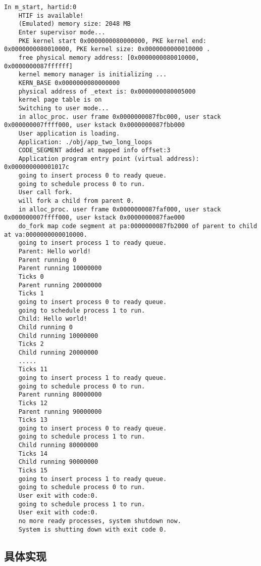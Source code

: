 \begin{lstlisting}[caption={lab9实验结果（移植K210前）}]
    In m_start, hartid:0
    HTIF is available!
    (Emulated) memory size: 2048 MB
    Enter supervisor mode...
    PKE kernel start 0x0000000080000000, PKE kernel end: 0x0000000080010000, PKE kernel size: 0x0000000000010000 .
    free physical memory address: [0x0000000080010000, 0x0000000087ffffff]
    kernel memory manager is initializing ...
    KERN_BASE 0x0000000080000000
    physical address of _etext is: 0x0000000080005000
    kernel page table is on
    Switching to user mode...
    in alloc_proc. user frame 0x0000000087fbc000, user stack 0x000000007ffff000, user kstack 0x0000000087fbb000
    User application is loading.
    Application: ./obj/app_two_long_loops
    CODE_SEGMENT added at mapped info offset:3
    Application program entry point (virtual address): 0x000000000001017c
    going to insert process 0 to ready queue.
    going to schedule process 0 to run.
    User call fork.
    will fork a child from parent 0.
    in alloc_proc. user frame 0x0000000087faf000, user stack 0x000000007ffff000, user kstack 0x0000000087fae000
    do_fork map code segment at pa:0000000087fb2000 of parent to child at va:0000000000010000.
    going to insert process 1 to ready queue.
    Parent: Hello world!
    Parent running 0
    Parent running 10000000
    Ticks 0
    Parent running 20000000
    Ticks 1
    going to insert process 0 to ready queue.
    going to schedule process 1 to run.
    Child: Hello world!
    Child running 0
    Child running 10000000
    Ticks 2
    Child running 20000000
    .....
    Ticks 11
    going to insert process 1 to ready queue.
    going to schedule process 0 to run.
    Parent running 80000000
    Ticks 12
    Parent running 90000000
    Ticks 13
    going to insert process 0 to ready queue.
    going to schedule process 1 to run.
    Child running 80000000
    Ticks 14
    Child running 90000000
    Ticks 15
    going to insert process 1 to ready queue.
    going to schedule process 0 to run.
    User exit with code:0.
    going to schedule process 1 to run.
    User exit with code:0.
    no more ready processes, system shutdown now.
    System is shutting down with exit code 0.    
\end{lstlisting}

\subsection{具体实现}

